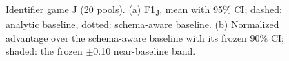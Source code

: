 \begin{figure}[t]\centering

\caption{Identifier game J (20 pools). (a) F1\textsubscript{J}, mean with 95\% CI; dashed: analytic baseline, dotted: schema-aware baseline. (b) Normalized advantage over the schema-aware baseline with its frozen 90\% CI; shaded: the frozen $\pm$0.10 near-baseline band.}
\label{fig:5}
\end{figure}
